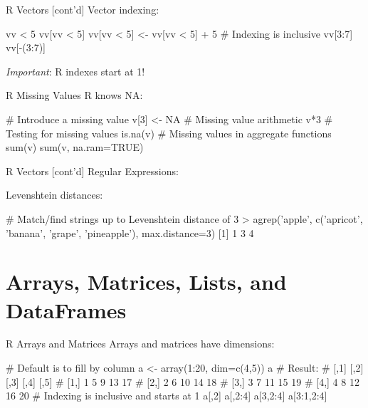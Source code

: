 \documentclass[ignorenonframetext,xcolor=x11names]{beamer}
\begin{document}
\begin{frame}[fragile]{R Vectors \small [cont'd]}
Vector indexing:
\begin{Rcode}
vv < 5
vv[vv < 5]
vv[vv < 5] <- vv[vv < 5] + 5
# Indexing is inclusive
vv[3:7]
vv[-(3:7)]
\end{Rcode}

\emph{Important}: R indexes start at 1!

\end{frame}

\begin{frame}[fragile]{R Missing Values}
R knows NA:
\begin{Rcode}
# Introduce a missing value
v[3] <- NA
# Missing value arithmetic
v*3
# Testing for missing values
is.na(v)
# Missing values in aggregate functions
sum(v)
sum(v, na.ram=TRUE)
\end{Rcode}
\end{frame}

\begin{frame}[fragile]{R Vectors \small [cont'd]}
Regular Expressions:
\footnotesize
{}
\normalsize
Levenshtein distances:
\footnotesize
\begin{Rcode}
# Match/find strings up to Levenshtein distance of 3
> agrep('apple', 
    c('apricot', 'banana', 'grape', 'pineapple'), 
    max.distance=3)
[1] 1 3 4
\end{Rcode}
\end{frame}

\section{Arrays, Matrices, Lists, and DataFrames}

\begin{frame}[fragile]{R Arrays and Matrices}
Arrays and matrices have dimensions:
\begin{Rcode}
# Default is to fill by column
a <- array(1:20, dim=c(4,5))
a
# Result:
#      [,1] [,2] [,3] [,4] [,5]
# [1,]    1    5    9   13   17
# [2,]    2    6   10   14   18
# [3,]    3    7   11   15   19
# [4,]    4    8   12   16   20
# Indexing is inclusive and starts at 1
a[,2]
a[,2:4]
a[3,2:4]
a[3:1,2:4]
\end{Rcode}
\end{frame}
\end{document}
